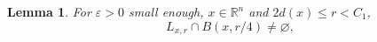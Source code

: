 \documentclass[11pt]{amsart}
\newcommand{\LL}{{\mathcal L}}
\newcommand{\ve}{{\varepsilon}}
\newtheorem{lemma}[theorem]{Lemma}
\theoremstyle{definition}
\theoremstyle{remark}
\numberwithin{equation}{section}
\newcommand{\av}[1]{\left| #1 \right|}
\def\Lip{\textrm{Lip}}
\begin{document}
%
%
%
%
%




\begin{lemma} \label{lem5.6}
For $\ve>0$ small enough, $x\in \mathbb{R}^{n}$ and $2d(x)\le r<C_{1}$, 
\begin{equation}\label{e:LcapB}
L_{x,r}\cap B(x,r/4)\neq\varnothing,
\end{equation} 


\end{lemma}
\end{document}
